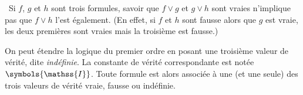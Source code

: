 \blank[medium]

\noindent {} Si $f$, $g$ et $h$ sont trois formules, savoir que $f \vee g$ et $g \vee h$ sont vraies n'implique pas que $f \vee h$ l'est également. 
(En effet, si $f$ et $h$ sont fausse alors que $g$ est vraie, les deux premières sont vraies mais la troisième est fausse.)

\stopsubsection


\startsubsection[title=Valeur de vérité Indéfinie, reference=sub:Indefinie]

On peut étendre la logique du premier ordre en posant une troisième valeur de vérité, dite \emph{indéfinie}. 
La constante de vérité correspondante est notée $\symbols{\mathss{I}}$. 
Toute formule est alors associée à une (et une seule) des trois valeurs de vérité vraie, fausse ou indéfinie. 

